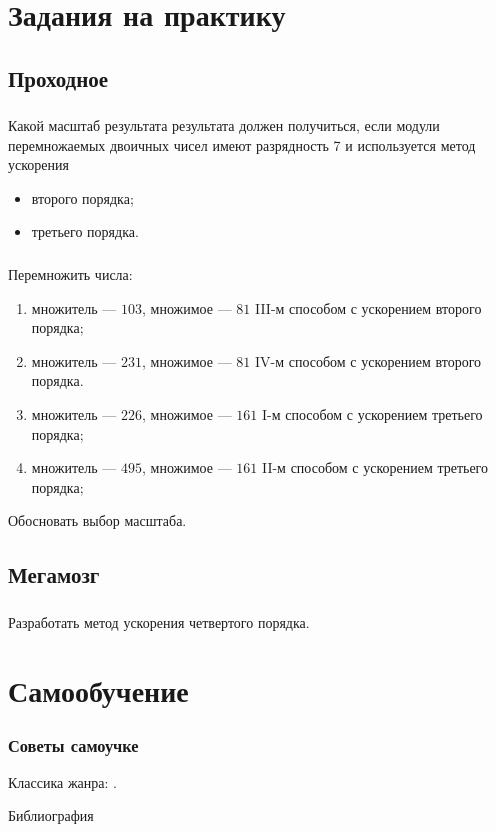 \appendix


\section{Задания на практику}


\subsection{Проходное}

\begin{frame}
    \frametitle{\TaskSimpleNumber}
    
    Какой масштаб результата результата должен получиться, если модули перемножаемых двоичных чисел имеют разрядность 7 и используется метод ускорения
    \begin{itemize}
        \item второго порядка;
        \item третьего порядка.
    \end{itemize}
\end{frame}

\begin{frame}
    \frametitle{\TaskSimpleNumber}

    Перемножить числа:

    \begin{enumerate}
        \item множитель --- $103$, множимое --- $81$ III-м способом с ускорением второго порядка; 
        \item множитель --- $231$, множимое --- $81$ IV-м способом с ускорением второго порядка.
        \item множитель --- $226$, множимое --- $161$ I-м  способом с ускорением третьего порядка; 
        \item множитель --- $495$, множимое --- $161$ II-м способом с ускорением третьего порядка; 
    \end{enumerate}
    
    Обосновать выбор масштаба.
\end{frame}

\subsection{Мегамозг}

\begin{frame}
    \frametitle{\TaskSimpleNumber}
    
    Разработать метод ускорения четвертого порядка.
\end{frame}

\section{Самообучение}

\begin{frame}
    \frametitle{Советы самоучке}
    
    Классика жанра: \cite{bib:lisikov:automateBase}.
\end{frame}

\begin{frame}[allowframebreaks]{Библиография}
    
    
\end{frame}

